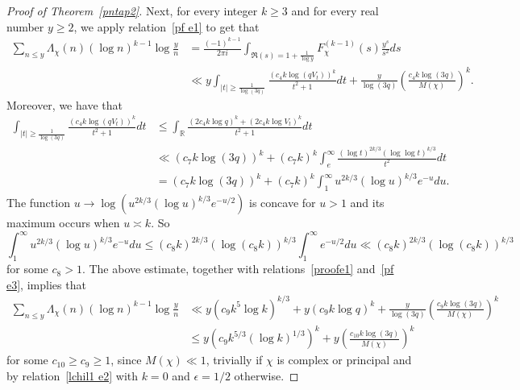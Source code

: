 \documentclass[12pt]{amsart}
\theoremstyle{remark}
\newcommand {\SR} {{\mathbb R}}
\newcommand{\bsp}{\begin{split}}
\newcommand{\be}{\begin{equation}}
\newcommand{\ee}{\end{equation}}
\numberwithin{equation}{section}
\begin{document}
\begin{proof}[Proof of Theorem~\ref{pntap2}]
Next, for every integer $k\ge3$ and for every real number $y\ge2$, we apply relation~\eqref{pf e1} to get that
\be\label{proofe1}\bsp
\sum_{n\le y}\Lambda_\chi(n)(\log n)^{k-1}\log\frac yn
&=\frac{(-1)^{k-1}}{2\pi i} \int_{\Re(s)=1+\frac1{\log y}} F_\chi^{(k-1)}(s) \frac{y^s}{s^2}  ds\\
&\ll y \int_{|t|\ge\frac1{\log(3q)}} \frac{ (c_4k\log(qV_t))^k }{t^2+1}dt + \frac{y}{\log(3q)}\left(\frac{c_4k\log(3q)}{M(\chi)} \right)^{k}.
\end{split}\ee
Moreover, we have that
\be\label{pf e3}\bsp
\int_{|t|\ge\frac1{\log(3q)}} \frac{ (c_4k\log(qV_t))^k }{t^2+1} dt & \le\int_{\SR} \frac{(2c_4k\log q)^k+(2c_4k\log V_t)^k }{t^2+1}dt\\
&\ll (c_7k\log(3q))^k+(c_7k)^k\int_e^\infty\frac{(\log t)^{2k/3}(\log\log t)^{k/3}}{t^2} dt \\
& = (c_7k\log(3q))^k+(c_7k)^k\int_1^\infty u^{2k/3}(\log u)^{k/3} e^{-u}du.
\end{split}\ee
The function $u\to \log(u^{2k/3}(\log u)^{k/3}e^{-u/2})$ is concave for $u>1$ and its maximum occurs when $u\asymp k$. So
$$
\int_1^\infty  u^{2k/3}(\log u)^{k/3} e^{-u} du\le (c_8k)^{2k/3}(\log(c_8k))^{k/3}\int_1^\infty  e^{-u/2}du
\ll(c_8k)^{2k/3}(\log(c_8k))^{k/3}
$$
for some $c_8>1$. The above estimate, together with relations~\eqref{proofe1} and~\eqref{pf e3}, implies that
\be\label{pf e4}\begin{split}
\sum_{n\le y}\Lambda_\chi(n)(\log n)^{k-1}\log\frac yn &\ll  y (c_9k^5\log k)^{k/3}+ y (c_9k\log q)^k + \frac{y}{\log(3q)} \left(\frac{c_9k\log(3q)}{M(\chi)} \right)^{k} \\
& \le y (c_9k^{5/3}(\log k)^{1/3})^k+ y \left(\frac{c_{10}k\log(3q)}{M(\chi)} \right)^{k}
\end{split}\ee
for some $c_{10}\ge c_9\ge1$, since $M(\chi)\ll1$, trivially if $\chi$ is complex or principal and by relation~\eqref{lchil1 e2} with $k=0$ and $\epsilon=1/2$ otherwise.


\end{proof}
\end{document}

